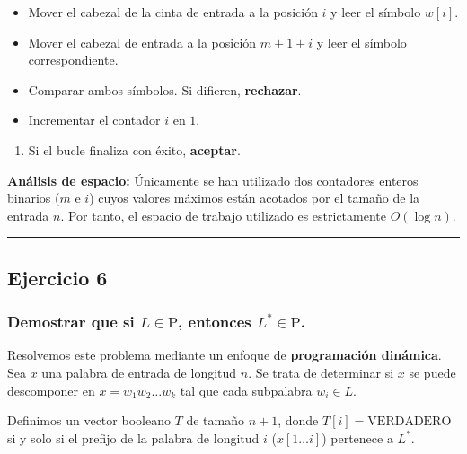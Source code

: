 \documentclass[12pt]{book} %
\providecommand{\tightlist}{%
  \setlength{\itemsep}{0pt}\setlength{\parskip}{0pt}}
\begin{document}
\begin{itemize}
\tightlist
\item
  Mover el cabezal de la cinta de entrada a la posición \(i\) y leer el
  símbolo \(w[i]\).
\item
  Mover el cabezal de entrada a la posición \(m + 1 + i\) y leer el
  símbolo correspondiente.
\item
  Comparar ambos símbolos. Si difieren, \textbf{rechazar}.
\item
  Incrementar el contador \(i\) en \(1\).
\end{itemize}

\begin{enumerate}
\def\labelenumi{\arabic{enumi}.}
\setcounter{enumi}{4}
\tightlist
\item
  Si el bucle finaliza con éxito, \textbf{aceptar}.
\end{enumerate}

\textbf{Análisis de espacio:} Únicamente se han utilizado dos contadores
enteros binarios (\(m\) e \(i\)) cuyos valores máximos están acotados
por el tamaño de la entrada \(n\). Por tanto, el espacio de trabajo
utilizado es estrictamente \textbf{\(O(\log n)\)}.

\begin{center}\rule{0.5\linewidth}{0.5pt}\end{center}

\hypertarget{ejercicio-6}{%
\subsection{Ejercicio 6}\label{ejercicio-6}}

\hypertarget{demostrar-que-si-l-in-textp-entonces-l-in-textp.}{%
\subsubsection{\texorpdfstring{Demostrar que si \(L \in \text{P}\),
entonces
\(L^{*} \in \text{P}\).}{Demostrar que si L \textbackslash in \textbackslash text\{P\}, entonces L\^{}\{*\} \textbackslash in \textbackslash text\{P\}.}}\label{demostrar-que-si-l-in-textp-entonces-l-in-textp.}}

Resolvemos este problema mediante un enfoque de \textbf{programación
dinámica}. Sea \(x\) una palabra de entrada de longitud \(n\). Se trata
de determinar si \(x\) se puede descomponer en \(x = w_1 w_2 \dots w_k\)
tal que cada subpalabra \(w_i \in L\).

Definimos un vector booleano \(T\) de tamaño \(n + 1\), donde
\(T[i] = \text{VERDADERO}\) si y solo si el prefijo de la palabra de
longitud \(i\) (\(x[1 \dots i]\)) pertenece a \(L^*\).
\end{document}
